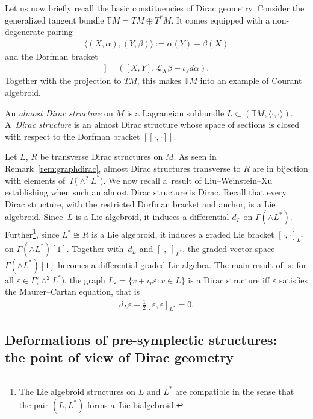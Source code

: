 \documentclass[10pt,a4paper]{amsart}
\numberwithin{equation}{section}
\newcommand{\Lie}{\mathcal{L}}
\newcommand{\T}{\mathbb{T}}
\newcommand{\oo}{[\![}
\newcommand{\cc}{]\!]}
\begin{document}
Let us now briefly recall the basic constituencies of Dirac geometry.
Consider the generalized tangent bundle $\T M=TM \oplus T^*M$. It comes equipped with a non-degenerate pairing
\begin{gather*}\langle(X,\alpha),(Y,\beta)\rangle := \alpha(Y) + \beta(X)\end{gather*}
and the Dorfman bracket
\begin{gather*}\oo(X,\alpha),(Y,\beta)\cc=([X,Y],\Lie_X\beta - \iota_Yd\alpha).\end{gather*}
Together with the projection to $TM$, this makes $\T M$ into an example of Courant algebroid.

\begin{Definition} An \emph{almost Dirac structure} on $M$ is a Lagrangian subbundle $L \subset (\T M,\langle\cdot,\cdot\rangle)$. A~\emph{Dirac structure} is an almost Dirac structure whose space of sections is closed
with respect to the Dorfman bracket $\oo\cdot,\cdot\cc$.
 \end{Definition}

\begin{Remark}\label{rem:LWXapp} Let $L$, $R$ be transverse Dirac structures on $M$. As seen in Remark~\ref{rem:graphdirac}, almost Dirac structures transverse to $R$ are in bijection with elements of~$\Gamma\big({\wedge}^2L^*\big)$. We now recall a~result of Liu--Weinstein--Xu \cite{LWX} establishing when such an almost Dirac structure is Dirac. Recall that every Dirac structure, with the restricted Dorfman bracket and anchor, is a Lie algebroid. Since~$L$ is a Lie algebroid, it induces a differential $d_L$ on $\Gamma(\wedge L^*)$. Further\footnote{The Lie algebroid structures on $L$ and $L^*$ are compatible in the sense that the pair $(L,L^*)$ forms a~Lie bialgebroid.}, since $L^*\cong R$ is a Lie algebroid, it induces a graded Lie bracket $[\cdot,\cdot]_{L^*}$ on $\Gamma(\wedge L^*)[1]$. Together with~$d_L$ and $[\cdot,\cdot]_{L^*}$, the graded vector space $\Gamma(\wedge L^*)[1]$ becomes a differential graded Lie algebra. The main result of \cite{LWX} is: for all $\varepsilon\in \Gamma\big({\wedge}^2L^*\big)$, the graph $L_{\varepsilon}=\{v+\iota_v\varepsilon\colon v\in L\}$ is a Dirac structure iff $\varepsilon$ satisfies the Maurer--Cartan equation, that is
\begin{gather*} d_L\varepsilon + \tfrac{1}{2}[\varepsilon,\varepsilon]_{L^*} =0.\end{gather*}
\end{Remark}

\subsection[Deformations of pre-symplectic structures: the point of view of Dirac geometry]{Deformations of pre-symplectic structures:\\ the point of view of Dirac geometry} \label{subsection:Diracview}
\end{document}
